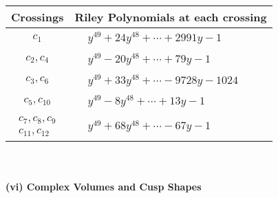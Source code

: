 \documentclass[1p]{elsarticle_modified}
\theoremstyle{definition}
\begin{document}
\begin{tabular}{m{50pt}|m{274pt}}
Crossings & \hspace{64pt}Riley Polynomials at each crossing \\
\hline $$\begin{aligned}c_{1}\end{aligned}$$&$\begin{aligned}
&y^{49}+24 y^{48}+\cdots+2991 y-1
\end{aligned}$\\
\hline $$\begin{aligned}c_{2},c_{4}\end{aligned}$$&$\begin{aligned}
&y^{49}-20 y^{48}+\cdots+79 y-1
\end{aligned}$\\
\hline $$\begin{aligned}c_{3},c_{6}\end{aligned}$$&$\begin{aligned}
&y^{49}+33 y^{48}+\cdots-9728 y-1024
\end{aligned}$\\
\hline $$\begin{aligned}c_{5},c_{10}\end{aligned}$$&$\begin{aligned}
&y^{49}-8 y^{48}+\cdots+13 y-1
\end{aligned}$\\
\hline $$\begin{aligned}c_{7},c_{8},c_{9}\\c_{11},c_{12}\end{aligned}$$&$\begin{aligned}
&y^{49}+68 y^{48}+\cdots-67 y-1
\end{aligned}$\\
\hline
\end{tabular}\\~\\
\newpage\flushleft \textbf{(vi) Complex Volumes and Cusp Shapes}
\end{document}
